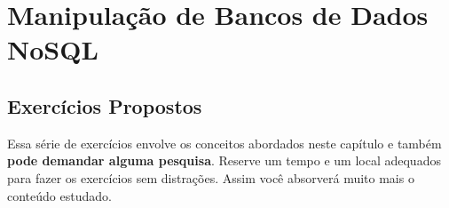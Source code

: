 \chapter{Manipulação de Bancos de Dados NoSQL}

\lipsum[1-1]

\section{Exercícios Propostos}

Essa série de exercícios envolve os conceitos abordados neste capítulo e também \textbf{pode demandar alguma pesquisa}. Reserve um tempo e um local adequados para fazer os exercícios sem distrações. Assim você absorverá muito mais o conteúdo estudado.